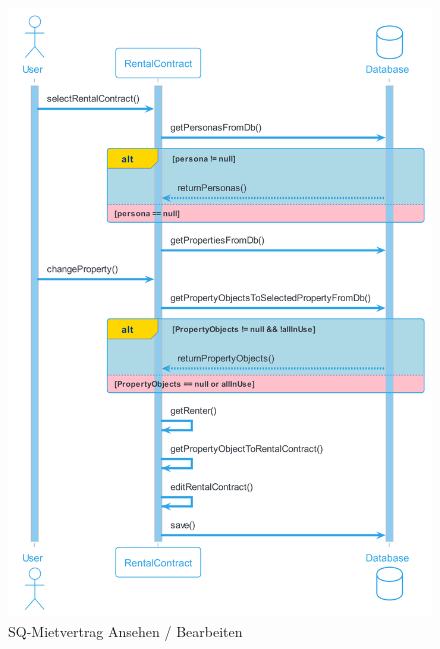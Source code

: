 \begin{figure}[H]
  \begin{center}
    \includegraphics[width=0.6\textheight]{content/diagrams/out/sequenzdiagram/mietvertragEditieren/mietvertragEditieren.png}
    \caption{SQ-Mietvertrag Ansehen / Bearbeiten}
    \label{sqMietvertragEdit}
  \end{center}
\end{figure}

